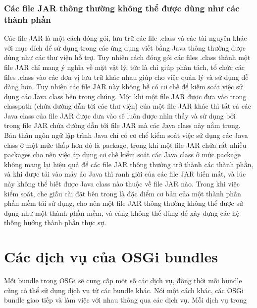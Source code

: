 \subsubsection{Các file JAR thông thường không thể được dùng như các thành phần}
Các file JAR là một cách đóng gói, lưu trữ các file .class và các tài nguyên khác \cite{jar} với mục đích để sử dụng trong các ứng dụng viết bằng Java thông thường được dùng như các thư viện hỗ trợ. Tuy nhiên cách đóng gói các files .class thành một file JAR chỉ mang ý nghĩa về mặt vật lý, tức là chỉ giúp phân tách, tổ chức các files .class vào các đơn vị lưu trữ khác nhau giúp cho việc quản lý và sử dụng dễ dàng hơn. Tuy nhiên các file JAR này không hề có cơ chế để kiếm soát việc sử dụng các Java class bên trong chúng. Một khi một file JAR được đưa vào trong classpath (chứa đường dẫn tới các thư viện) của một file JAR khác thì tất cả các Java class của file JAR được đưa vào sẽ luôn được nhìn thấy và sử dụng bởi trong file JAR chứa đường dẫn tới file JAR mà các Java class này nằm trong. Bản thân ngôn ngữ lập trình Java chỉ có cơ chế kiểm soát việc sử dụng các Java class ở một mức thấp hơn đó là package, trong khi một file JAR chứa rất nhiều packages cho nên việc áp dụng cơ chế kiểm soát các Java class ở mức package không mang lại hiệu quả để các file JAR thông thường trở thành các thành phần, và khi được tải vào máy ảo Java thì ranh giới của các file JAR biến mất, và lúc này không thể biết được Java class nào thuộc về file JAR nào. Trong khi việc kiểm soát, che giấu cài đặt bên trong là đặc điểm cơ bản của một thành phần phần mềm tái sử dụng, cho nên một file JAR thông thường không thể được sử dụng như một thành phần mềm, và càng không thể dùng để xây dựng các hệ thống hướng thành phần thực sự.

\section{Các dịch vụ của OSGi bundles}

Mỗi bundle trong OSGi sẽ cung cấp một số các dịch vụ, đồng thời mỗi bundle cũng có thể sử dụng dịch vụ từ các bundle khác. Nói một cách khác, các OSGi bundle giao tiếp và làm việc với nhau thông qua các dịch vụ. Mỗi dịch vụ trong 
